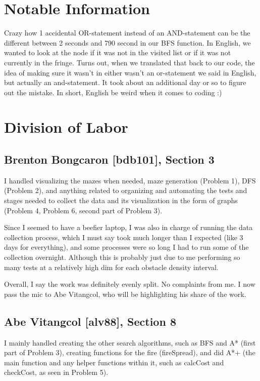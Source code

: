 \documentclass[11pt]{article}
\begin{document}
\section{Notable Information}
Crazy how 1 accidental OR-statement instead of an AND-statement can be the different between 2 seconds and 790 second in our BFS function. In English, we wanted to look at the node if it was not in the visited list or if it was not currently in the fringe. Turns out, when we translated that back to our code, the idea of making sure it wasn't in either wasn't an or-statement we said in English, but actually an and-statement. It took about an additional day or so to figure out the mistake. In short, English be weird when it comes to coding :)
\pagebreak
\section{Division of Labor}
\subsection*{Brenton Bongcaron [bdb101], Section 3}
I handled visualizing the mazes when needed, maze generation (Problem 1), DFS (Problem 2), and anything related to organizing and automating the tests and stages needed to collect the data and its visualization in the form of graphs (Problem 4, Problem 6, second part of Problem 3). 

Since I seemed to have a beefier laptop, I was also in charge of running the data collection process, which I must say took much longer than I expected (like 3 days for everything), and some processes were so long I had to run some of the collection overnight. Although this is probably just due to me performing so many tests at a relatively high dim for each obstacle density interval.

Overall, I say the work was definitely evenly split. No complaints from me. I now pass the mic to Abe Vitangcol, who will be highlighting his share of the work.\\
\subsection*{Abe Vitangcol [alv88], Section 8}
I mainly handled creating the other search algorithms, such as BFS and A* (first part of Problem 3), creating functions for the fire (fireSpread), and did A*+ (the main function and any helper functions within it, such as calcCost and checkCost, as seen in Problem 5).
\end{document}
